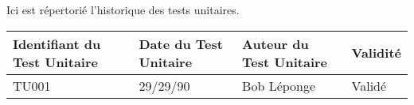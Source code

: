 
Ici est répertorié l'historique des tests unitaires. \\

\begin{table}[H]
\centering
	\begin{tabularx}{17.4cm}{|X|X|X|X|}
	\hline
	\rowcolor{gray!40} Identifiant du Test Unitaire & Date du Test Unitaire & Auteur du Test Unitaire & Validité\\
	\hline
	 TU001 & 29/29/90 & Bob Léponge & Validé \\
	\hline
	\end{tabularx}
\end{table}

